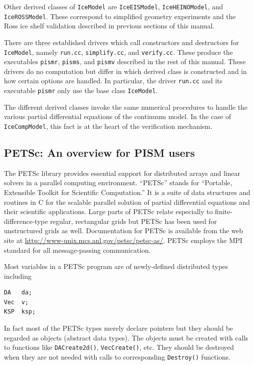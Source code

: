 \documentclass[12pt,final]{amsart}
\renewcommand{\t}[1]{\texttt{#1}}
\begin{document}
Other derived classes of \t{IceModel} are \t{IceEISModel}, \t{IceHEINOModel}, and \t{IceROSSModel}.  These correspond to simplified geometry experiments and the Ross ice shelf validation described in previous sections of this manual.

There are three established drivers which call constructors and destructors for \t{IceModel}, namely \verb|run.cc|, \verb|simplify.cc|, and \verb|verify.cc|.  These produce the executables \verb|pismr|, \verb|pisms|, and \verb|pismv| described in the rest of this manual.  These drivers do no computation but differ in which derived class is constructed and in how certain options are handled.  In particular, the driver \verb|run.cc| and its executable \verb|pismr| only use the base class \verb|IceModel|.

The different derived classes invoke the same numerical procedures to handle the various partial differential equations of the continuum model.  In the case of \t{IceCompModel}, this fact is at the heart of the verification mechanism.  

\subsection{PETSc: An overview for PISM users}  The PETSc library \cite{petsc-user-ref,petsc-efficient} provides essential support for distributed arrays and linear solvers in a parallel computing environment.  ``PETSc'' stands for ``Portable, Extensible Toolkit for Scientific Computation.''  It is a suite of data structures and routines in C for the scalable parallel solution of partial differential equations and their scientific applications.  Large parts of PETSc relate especially to finite-difference-type regular, rectangular grids but PETSc has been used for unstructured grids as well.  Documentation for PETSc is available from the web site at \url{http://www-unix.mcs.anl.gov/petsc/petsc-as/}.  PETSc employs the MPI standard for all message-passing communication.

Most variables in a PETSc program are of newly-defined distributed types including
\begin{verbatim}
DA   da;
Vec  v;
KSP  ksp;
\end{verbatim}
In fact most of the PETSc types merely declare pointers but they should be regarded as objects (abstract data types).  The objects must be created with calls to functions like \t{DACreate2d()}, \t{VecCreate()}, etc.  They should be destroyed when they are not needed with calls to corresponding \t{Destroy()} functions.
\end{document}

